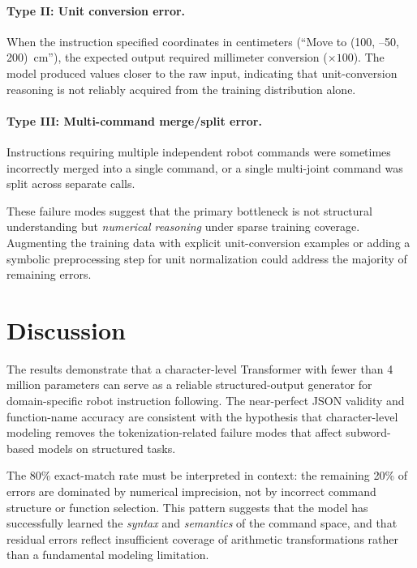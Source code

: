 \documentclass[11pt,a4paper]{article}
\begin{document}
\paragraph{Type II: Unit conversion error.}
When the instruction specified coordinates in centimeters (``Move to (100, --50, 200)~cm''),
the expected output required millimeter conversion ($\times 100$). The model produced values closer to the raw input,
indicating that unit-conversion reasoning is not reliably acquired from the training distribution alone.

\paragraph{Type III: Multi-command merge/split error.}
Instructions requiring multiple independent robot commands were sometimes incorrectly merged into a single command,
or a single multi-joint command was split across separate calls.

These failure modes suggest that the primary bottleneck is not structural understanding but \emph{numerical reasoning} under sparse training coverage.
Augmenting the training data with explicit unit-conversion examples or adding a symbolic preprocessing step
for unit normalization could address the majority of remaining errors.

\section{Discussion}

The results demonstrate that a character-level Transformer with fewer than 4 million parameters
can serve as a reliable structured-output generator for domain-specific robot instruction following.
The near-perfect JSON validity and function-name accuracy are consistent with the hypothesis
that character-level modeling removes the tokenization-related failure modes that affect subword-based models on structured tasks.

The 80\% exact-match rate must be interpreted in context: the remaining 20\% of errors are dominated by numerical imprecision,
not by incorrect command structure or function selection.
This pattern suggests that the model has successfully learned the \emph{syntax} and \emph{semantics} of the command space,
and that residual errors reflect insufficient coverage of arithmetic transformations rather than a fundamental modeling limitation.
\end{document}
